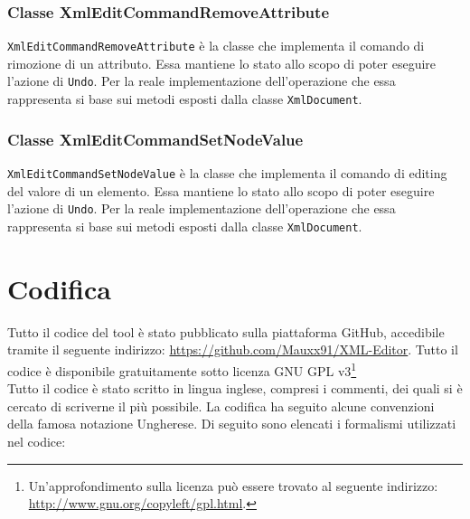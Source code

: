 	\subsubsection{Classe XmlEditCommandRemoveAttribute}
		\texttt{XmlEditCommandRemoveAttribute} è la classe che implementa il comando di rimozione di un attributo. Essa mantiene lo stato allo scopo di poter eseguire l'azione di \texttt{Undo}. Per la reale implementazione dell'operazione che essa rappresenta si base sui metodi esposti dalla classe \texttt{XmlDocument}.
		
	\subsubsection{Classe XmlEditCommandSetNodeValue}
		\texttt{XmlEditCommandSetNodeValue} è la classe che implementa il comando di editing del valore di un elemento. Essa mantiene lo stato allo scopo di poter eseguire l'azione di \texttt{Undo}. Per la reale implementazione dell'operazione che essa rappresenta si base sui metodi esposti dalla classe \texttt{XmlDocument}.












\section{Codifica}
Tutto il codice del tool è stato pubblicato sulla piattaforma GitHub, accedibile tramite il seguente indirizzo: \url{https://github.com/Mauxx91/XML-Editor}. Tutto il codice è disponibile gratuitamente sotto licenza GNU GPL v3\footnote{Un'approfondimento sulla licenza può essere trovato al seguente indirizzo: \url{http://www.gnu.org/copyleft/gpl.html}.}\\

Tutto il codice è stato scritto in lingua inglese, compresi i commenti, dei quali si è cercato di scriverne il più possibile.
La codifica ha seguito alcune convenzioni della famosa notazione Ungherese. Di seguito sono elencati i formalismi utilizzati nel codice:

